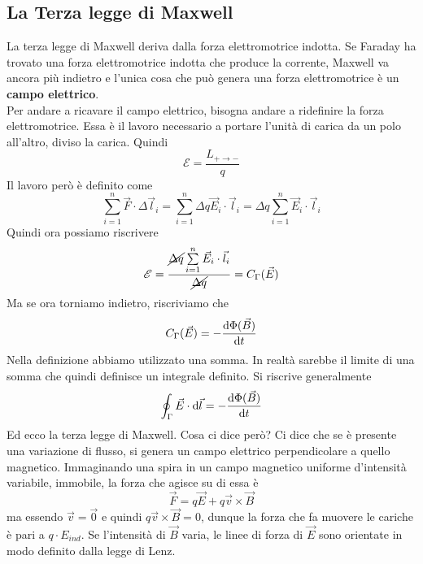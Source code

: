 \subsection{La Terza legge di Maxwell}
La terza legge di Maxwell deriva dalla forza elettromotrice indotta. Se Faraday
ha trovato una forza elettromotrice indotta che produce la corrente, Maxwell va ancora più indietro
e l'unica cosa che può genera una forza elettromotrice è un \textbf{campo elettrico}.\\
Per andare a ricavare il campo elettrico, bisogna andare a ridefinire la forza
elettromotrice. Essa è il lavoro necessario a portare
l'unità di carica da un polo all'altro, diviso la carica. Quindi
\begin{equation*}
  \mathcal{E} = \frac{L_{+\to-}}{q}
\end{equation*}
Il lavoro però è definito come
\begin{equation*}
  \sum\limits^{n}_{i=1} \vec{F}\cdot\Delta\vec{l}_i = 
  \sum\limits^{n}_{i=1} \Delta q\vec{E}_i\cdot\vec{l}_i=
  \Delta q \sum\limits^{n}_{i=1} \vec{E}_i\cdot\vec{l}_i
\end{equation*}
Quindi ora possiamo riscrivere 
\begin{equation*}
  \mathcal{E}=\frac{\cancel{\Delta q}\sum\limits^{n}_{i=1}\vec{E}_i\cdot\vec{l}_i}{\cancel{\Delta q}}
  = C_\Gamma(\vec{E})
\end{equation*}
Ma se ora torniamo indietro, riscriviamo che
\begin{equation*}
  C_\Gamma(\vec{E}) = -\frac{\mathop{}\!\mathrm{d} \Phi(\vec{B})}{\mathop{}\!\mathrm{d} t}
\end{equation*}
Nella definizione abbiamo utilizzato una somma. In realtà sarebbe il limite di una somma che quindi
definisce un integrale definito. Si riscrive generalmente
\begin{equation*}
  \oint_\Gamma\vec{E}\cdot\mathop{}\!\mathrm{d}\vec{l} = -\frac{\mathop{}\!\mathrm{d} \Phi(\vec{B})}{\mathop{}\!\mathrm{d} t}
\end{equation*}
Ed ecco la terza legge di Maxwell. Cosa ci dice però? Ci dice che se è presente una variazione di
flusso, si genera un campo elettrico perpendicolare a quello magnetico.
Immaginando una spira in un campo magnetico uniforme d'intensità variabile, immobile, la forza che 
agisce su di essa è
\begin{equation*}
  \vec{F} = q\vec{E}+q\vec{v}\times\vec{B}
\end{equation*}
ma essendo $\vec{v} = \vec{0}$ e quindi $q\vec{v}\times\vec{B} = 0$, dunque la forza che fa muovere
le cariche è pari a $q\cdot E_{ind}$. Se l'intensità di $\vec{B}$ varia, le linee di forza di 
$\vec{E}$ sono orientate in modo definito dalla legge di Lenz.


